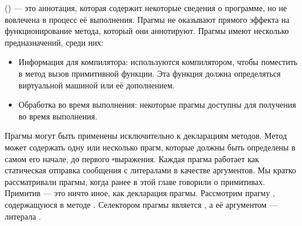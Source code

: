 \documentclass[a4paper,10pt,twoside]{book}
\begin{document}
 () --- это аннотация, которая содержит некоторые сведения о программе, но не вовлечена в процесс её выполнения. Прагмы не оказывают прямого эффекта на функционирование метода, который они аннотируют.
Прагмы имеют несколько предназначений, среди них:
\begin{itemize}
\item Информация для компилятора:  используются компилятором, чтобы поместить в метод вызов примитивной функции. Эта функция должна определяться виртуальной машиной или её дополнением.
\item Обработка во время выполнения: некоторые прагмы доступны для получения во время выполнения.
\end{itemize}

Прагмы могут быть применены исключительно к декларациям методов. Метод может содержать одну или несколько прагм, которые должны быть определены в самом его начале, до первого \st-выражения. Каждая прагма работает как статическая отправка сообщения с литералами в качестве аргументов.
Мы кратко рассматривали прагмы, когда ранее в этой главе говорили о примитивах. Примитив --- это ничто иное, как декларация прагмы.
Рассмотрим прагму , содержащуюся в методе . Селектором прагмы является , а её аргументом ---  литерала .
\end{document}

